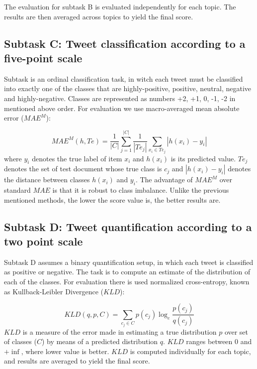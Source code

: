 \documentclass[runningheads,a4paper]{llncs}
\begin{document}
The evaluation for subtask B is evaluated independently for each topic. The results are then averaged across topics to yield the final score.


\subsection{Subtask C: Tweet classification according to a five-point scale}

Subtask is an ordinal classification task, in witch each tweet must be classified into exactly one of the classes that are highly-positive, positive, neutral, negative and highly-negative. Classes are represented as numbers {+2, +1, 0, -1, -2} in mentioned above order. For evaluation we use macro-averaged mean absolute error ($MAE^M$):

\begin{equation}
MAE^M(h, Te) = \frac{1}{|C|}\sum_{j=1}^{|C|}\frac{1}{|Te_j|}\sum_{x_i\in Te_j}|h(x_i) - y_i|
\end{equation}
where $y_i$ denotes the true label of item $x_i$ and $h(x_i)$ is its predicted value. $Te_j$ denotes the set of test document whose true class is $c_j$ and $|h(x_i) - y_i|$ denotes the distance between classes $h(x_i)$ and $y_i$. The advantage of $MAE^M$ over standard $MAE$ is that it is robust to class imbalance. Unlike the previous mentioned methods, the lower the score value is, the better results are. 



\subsection{Subtask D: Tweet quantification according to a two point scale}

Subtask D assumes a binary quantification setup, in which each tweet is classified as positive or negative. The task is to compute an estimate of the distribution of each of the classes. For evaluation there is used normalized cross-entropy, known as Kullback-Leibler Divergence ($KLD$):

\begin{equation}
KLD(q, p, C) = \sum_{c_j \in C}p(c_j)\log_e\frac{p(c_j)}{q(c_j)}
\end{equation}
$KLD$ is a measure of the error made in estimating a true distribution $p$ over set of classes ($C$) by means of a predicted distribution $q$. $KLD$ ranges between 0 and $+\inf$, where lower value is better. $KLD$ is computed individually for each topic, and results are averaged to yield the final score.
\end{document}
